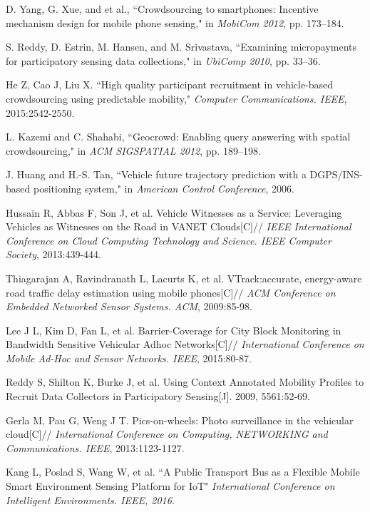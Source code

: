 \documentclass[journal]{IEEEtran}
\begin{document}
\begin{thebibliography}{1}
D. Yang, G. Xue, and et al., ``Crowdsourcing to smartphones: Incentive mechanism design for mobile phone sensing," in\textit{ MobiCom 2012}, pp. 173–184.

S. Reddy, D. Estrin, M. Hansen, and M. Srivastava, ``Examining micropayments for participatory sensing data collections," in \textit{UbiComp 2010}, pp. 33–36.

He Z, Cao J, Liu X. ``High quality participant recruitment in vehicle-based crowdsourcing using predictable mobility," \textit{Computer Communications. IEEE}, 2015:2542-2550.

L. Kazemi and C. Shahabi, ``Geocrowd: Enabling query answering with spatial crowdsourcing," in \textit{ACM SIGSPATIAL 2012}, pp. 189–198.

J. Huang and H.-S. Tan, ``Vehicle future trajectory prediction with a DGPS/INS-based positioning system," in \textit{American Control Conference}, 2006.

Hussain R, Abbas F, Son J, et al. Vehicle Witnesses as a Service: Leveraging Vehicles as Witnesses on the Road in VANET Clouds[C]// \textit{IEEE International Conference on Cloud Computing Technology and Science. IEEE Computer Society}, 2013:439-444.

Thiagarajan A, Ravindranath L, Lacurts K, et al. VTrack:accurate, energy-aware road traffic delay estimation using mobile phones[C]// \textit{ACM Conference on Embedded Networked Sensor Systems. ACM}, 2009:85-98.

Lee J L, Kim D, Fan L, et al. Barrier-Coverage for City Block Monitoring in Bandwidth Sensitive Vehicular Adhoc Networks[C]// \textit{International Conference on Mobile Ad-Hoc and Sensor Networks. IEEE}, 2015:80-87.

Reddy S, Shilton K, Burke J, et al. Using Context Annotated Mobility Profiles to Recruit Data Collectors in Participatory Sensing[J]. 2009, 5561:52-69.
 
Gerla M, Pau G, Weng J T. Pics-on-wheels: Photo surveillance in the vehicular cloud[C]// \textit{International Conference on Computing, NETWORKING and Communications. IEEE}, 2013:1123-1127.






 Kang L, Poslad S, Wang W, et al. ``A Public Transport Bus as a Flexible Mobile Smart Environment Sensing Platform for IoT" \textit{ International Conference on Intelligent Environments. IEEE, 2016}.
 

\end{thebibliography}
\end{document}

